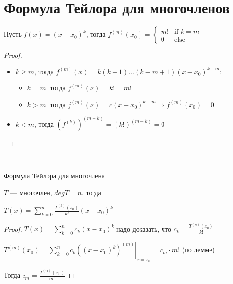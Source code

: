 \section{Формула Тейлора для многочленов}

\begin{lemma}

    Пусть $f(x) = (x -x_0)^k$, тогда $f^{(m)}(x_0) =
    \begin{cases}
        m! &\text{if $k=m$}\\
        0 &\text{else}
    \end{cases}$
\end{lemma}
\begin{proof}
    \begin{itemize}
        \item $k \geq m$, тогда $f^{(m)}(x) = k(k-1) \dots (k-m+1)(x-x_0)^{k-m}$:
        \begin{itemize}
            \item $k = m$, тогда $f^{(m)}(x) = k! = m!$
            \item $k > m$, тогда $f^{(m)}(x) = c (x-x_0)^{k-m} \Longrightarrow f^{(m)}(x_0) = 0$
        \end{itemize}
        
        \item $k < m$, тогда $(f^{(k)})^{(m-k)} = (k!)^{(m-k)} = 0$
    \end{itemize}
\end{proof}
\
\begin{theorem-non}
    Формула Тейлора для многочлена

    $T$ --- многочлен, $deg T = n$. тогда

    $T(x) = \sum\limits_{k=0}^n \frac{T^{(k)}(x_0)}{k!} (x-x_0)^k$
\end{theorem-non}
\begin{proof}
    $T(x) = \sum\limits_{k = 0}^{n} c_k (x-x_0)^k$ \quad надо доказать, что $c_k = \frac{T^{(n)}(x_0)}{k!}$

    $T^{(m)}(x_0) = \left.\sum\limits_{k = 0}^{n} c_k ((x-x_0)^k)^{(m)} \right|_{x=x_0} = c_m \cdot m!$ (по лемме)

    Тогда $c_m = \frac{T^{(m)}(x_0)}{m!}$
\end{proof}

